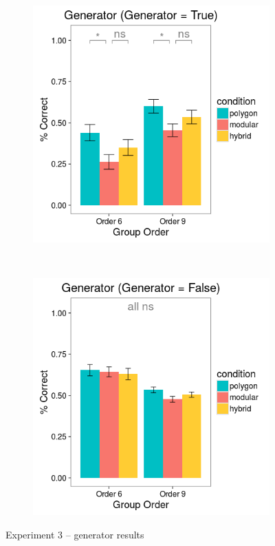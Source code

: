 \documentclass[man,10pt]{apa6}
\begin{document}
\begin{figure}[H]
\centering
\begin{subfigure}[c]{0.3\textwidth}
\centering
\includegraphics[width=\textwidth]{figures/3/gen_T_r.png}
\end{subfigure}
~
\begin{subfigure}[c]{0.3\textwidth}
\centering
\includegraphics[width=\textwidth]{figures/3/gen_F_r.png}
\end{subfigure}
\caption{Experiment 3 -- generator results}
\label{ex3_gen}
\end{figure}\noindent 
\end{document}
